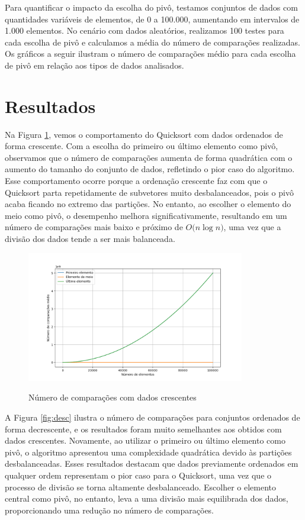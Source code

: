 \documentclass[12pt]{article}
\begin{document}
Para quantificar o impacto da escolha do pivô, testamos conjuntos de dados com quantidades variáveis de elementos, de 0 a 100.000, aumentando em intervalos de 1.000 elementos. No cenário com dados aleatórios, realizamos 100 testes para cada escolha de pivô e calculamos a média do número de comparações realizadas. Os gráficos a seguir ilustram o número de comparações médio para cada escolha de pivô em relação aos tipos de dados analisados.

\section{Resultados}

Na Figura \ref{fig:asc}, vemos o comportamento do Quicksort com dados ordenados de forma crescente. Com a escolha do primeiro ou último elemento como pivô, observamos que o número de comparações aumenta de forma quadrática com o aumento do tamanho do conjunto de dados, refletindo o pior caso do algoritmo. Esse comportamento ocorre porque a ordenação crescente faz com que o Quicksort parta repetidamente de subvetores muito desbalanceados, pois o pivô acaba ficando no extremo das partições. No entanto, ao escolher o elemento do meio como pivô, o desempenho melhora significativamente, resultando em um número de comparações mais baixo e próximo de $O(n \log{n)}$, uma vez que a divisão dos dados tende a ser mais balanceada.

\begin{figure}[H]
\centering
\caption{Número de comparações com dados crescentes}
\includegraphics[width=0.85\textwidth]{ascending.png}
\label{fig:asc}
\end{figure}

A Figura \ref{fig:desc} ilustra o número de comparações para conjuntos ordenados de forma decrescente, e os resultados foram muito semelhantes aos obtidos com dados crescentes. Novamente, ao utilizar o primeiro ou último elemento como pivô, o algoritmo apresentou uma complexidade quadrática devido às partições desbalanceadas. Esses resultados destacam que dados previamente ordenados em qualquer ordem representam o pior caso para o Quicksort, uma vez que o processo de divisão se torna altamente desbalanceado. Escolher o elemento central como pivô, no entanto, leva a uma divisão mais equilibrada dos dados, proporcionando uma redução no número de comparações.
\end{document}
